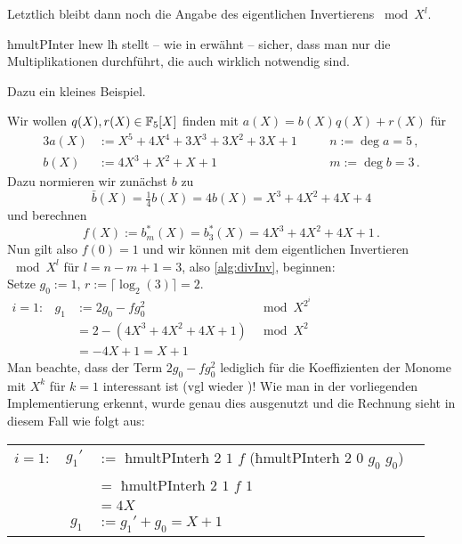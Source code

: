
Letztlich bleibt dann noch die Angabe des eigentlichen Invertierens $\bmod
X^l$.


ħmultPInter lnew lħ stellt -- wie in  erwähnt -- sicher, dass 
man nur die Multiplikationen durchführt, die auch wirklich notwendig sind.

Dazu ein kleines Beispiel.

\begin{beispiel}
  Wir wollen $q(X),r(X)\in \mathbb{F}_5[X]$ finden mit
  $a(X) = b(X) q(X) + r(X)$ für 
  \begin{alignat*}{3}
    a(X) &:= X^5 + 4X^4 + 3 X^3 + 3 X^2 + 3 X + 1 &&\quad n:= \deg a = 5\,,\\
    b(X) &:= 4 X^3 + X^2 + X + 1 &&\quad m := \deg b = 3\,.
  \end{alignat*}
  Dazu normieren wir zunächst $b$ zu 
  \[ \bar b(X) = \tfrac{1}{4} b(X) = 4 b(X) = X^3 + 4 X^2 +4X +4\]
  und berechnen 
  \[ f(X) := b^\ast_m(X) = b^\ast_3(X) = 4X^3 + 4X^2 + 4X + 1\,.\]
  Nun gilt also $f(0) = 1$ und wir können mit dem eigentlichen Invertieren
  $\mod X^l$ für $ l = n-m+1 = 3$, also \autoref{alg:divInv}, beginnen:\\
  Setze $g_0 := 1$, $r := \lceil \log_2(3)\rceil = 2$.\\
  $\begin{array}{lrll}
    i=1: & g_1 & := 2g_0 - fg_0^2 & \bmod X^{2^i}\\
              && = 2 - (4X^3+4X^2+4X+1) &\bmod X^2 \\
              && = -4X +1 = X+1
  \end{array}$\\
  Man beachte, dass der Term $2g_0 - fg_0^2$ lediglich für die Koeffizienten
  der Monome mit $X^k$ für $k=1$ interessant ist (vgl wieder 
  )! Wie man in der vorliegenden Implementierung erkennt,
  wurde genau dies ausgenutzt und die Rechnung sieht in diesem Fall wie folgt
  aus:\\
  \begin{tabular}{lrll}
    $i=1:$ & $g_1'$&$:=$ ħmultPInterħ $2$ $1$ $f$ (ħmultPInterħ $2$ $0$ $g_0$ $g_0$)\\
            &&$=$ ħmultPInterħ $2$ $1$ $f$ $1$\\
            &&$= 4X$\\
        & $g_1$&$:= g_1' + g_0 = X+1$

\end{tabular}
\end{beispiel}
